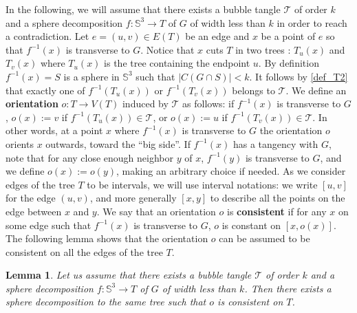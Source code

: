 \documentclass[11pt,a4paper]{article}
\newcommand{\Sp}{\mathbb S}
\newcommand{\bfdex}[1]{\textbf{#1}\index{#1}}
\newcommand{\T}{\mathcal{T}}
\newtheorem{lem}[theorem]{Lemma}
\begin{document}
In the following, we will assume that there exists a bubble tangle $\T$ of order $k$ and a sphere decomposition $f : \Sp^3 \rightarrow T$ of $G$ of width less than $k$ in order to reach a contradiction.
Let $e = (u,v) \in E(T)$ be an edge and $x$ be a point of $e$ so that $f^{-1}(x)$ is transverse to $G$. Notice that $x$ cuts $T$ in two trees : $T_u(x)$ and $T_v(x)$ where $T_u(x)$ is the tree containing the endpoint $u$. By definition $f^{-1} (x) = S$ is a sphere in $\Sp^3$ such that $|C(G \cap S)| < k$. It follows by \ref{def_T2} that exactly one of $f^{-1} (T_u(x))$ or $f^{-1} (T_v(x))$ belongs to $\T$. We define an \bfdex{orientation} $o: T \rightarrow V(T)$ induced by $\T$ as follows: if $f^{-1} (x)$ is transverse to $G$, $o(x):=v$ if $f^{-1} (T_u(x)) \in \T$, or $o(x):=u$ if $f^{-1} (T_v(x)) \in \T$. In other words, at a point $x$ where $f^{-1} (x)$ is transverse to $G$ the orientation $o$ orients $x$ outwards, toward the  ``big side''. If $f^{-1}(x)$ has a tangency with $G$, note that for any close enough neighbor $y$ of $x$, $f^{-1}(y)$ is transverse to $G$, and we define $o(x):=o(y)$, making an arbitrary choice if needed.
As we consider edges of the tree $T$ to be intervals, we will use interval notations: we write $[u,v]$ for the edge $(u,v)$, and more generally $[x,y]$ to describe all the points on the edge between $x$ and $y$. We say that an orientation $o$ is \bfdex{consistent} if for any $x$ on some edge such that $f^{-1}(x)$ is transverse to $G$, $o$ is constant on $[x,o(x)]$.
The following lemma shows that the orientation $o$ can be assumed to be consistent on all the edges of the tree $T$.


\begin{lem}\label{lem_orientable_edges}
Let us assume that there exists a bubble tangle $\T$ of order $k$ and a sphere decomposition $f : \Sp^3 \rightarrow T$ of $G$ of width less than $k$. Then there exists a sphere decomposition to the same tree such that $o$ is consistent on $T$.
\end{lem}
\end{document}
